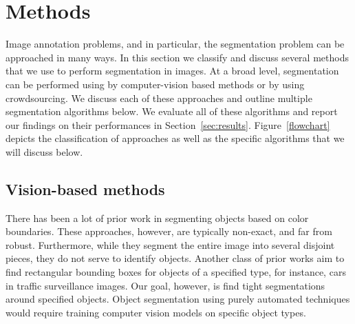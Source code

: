 \section{Methods\label{sec:methods}}

Image annotation problems, and in particular, the segmentation problem can be approached in many ways. In this section we classify and discuss several methods that we use to perform segmentation in images. 
At a broad level, segmentation can be performed using by computer-vision based methods or by using crowdsourcing. We discuss each of these approaches and outline multiple segmentation algorithms below. We evaluate all of these algorithms and report our findings on their performances in Section~\ref{sec:results}.
Figure~\ref{flowchart} depicts the classification of approaches as well as the specific algorithms that we will discuss below.

\subsection{Vision-based methods~\label{sec:vision}}
There has been a lot of prior work in segmenting objects based on color boundaries. These approaches, however, are typically non-exact, and far from robust. Furthermore, while they segment the entire image into several disjoint pieces, they do not serve to identify objects. Another class of prior works aim to find rectangular bounding boxes for objects of a specified type, for instance, cars in traffic surveillance images. Our goal, however, is find tight segmentations around specified objects.  Object segmentation using purely automated techniques would require training computer vision models on specific object types. 

